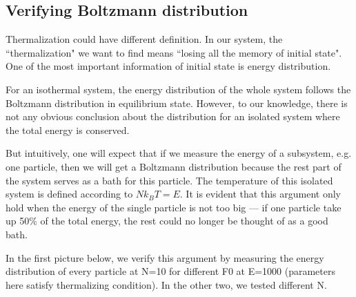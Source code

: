 \documentclass[aps,pre,twocolumn,groupedaddress]{revtex4-1}
\begin{document}
\subsection{Verifying Boltzmann distribution}
Thermalization could have different definition. In our system, the ``thermalization" we want to find means ``losing all the memory of initial state". One of the most important information of initial state is energy distribution. 
 
For an isothermal system, the energy distribution of the whole system follows the Boltzmann distribution in equilibrium state. However, to our knowledge, there is not any obvious conclusion about the distribution for an isolated system where the total energy is conserved.

But intuitively, one will expect that if we measure the energy of a subsystem, e.g. one particle, then we will get a Boltzmann distribution because the rest part of the system serves as a bath for this particle. The temperature of this isolated system is defined according to $Nk_BT=E$. It is evident that this argument only hold when the energy of the single particle is not too big --- if one particle take up 50\% of the total energy, the rest could no longer be thought of as a good bath.

In the first picture below, we verify this argument by measuring the energy distribution of every particle at N=10 for different F0 at E=1000 (parameters here satisfy thermalizing condition). In the other two, we tested different N.
\end{document}
